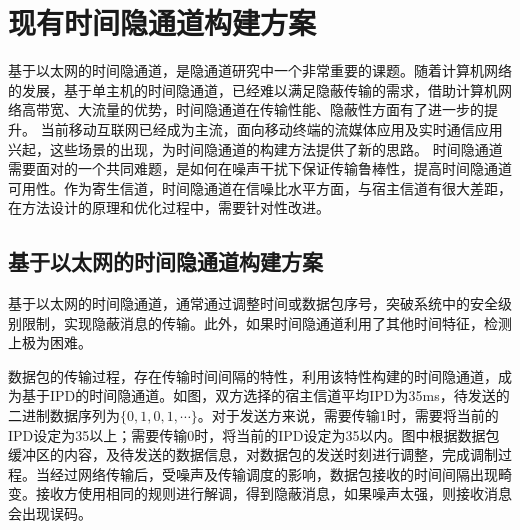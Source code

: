 \section{现有时间隐通道构建方案}
\label{chap:backinfo:ctc}

基于以太网的时间隐通道，是隐通道研究中一个非常重要的课题。随着计算机网络的发展，基于单主机的时间隐通道，已经难以满足隐蔽传输的需求，借助计算机网络高带宽、大流量的优势，时间隐通道在传输性能、隐蔽性方面有了进一步的提升。
当前移动互联网已经成为主流，面向移动终端的流媒体应用及实时通信应用兴起，这些场景的出现，为时间隐通道的构建方法提供了新的思路。
时间隐通道需要面对的一个共同难题，是如何在噪声干扰下保证传输鲁棒性，提高时间隐通道可用性。作为寄生信道，时间隐通道在信噪比水平方面，与宿主信道有很大差距，在方法设计的原理和优化过程中，需要针对性改进。

\subsection{基于以太网的时间隐通道构建方案}
\label{chap:backinfo:ctc:ethernet}
基于以太网的时间隐通道，通常通过调整时间或数据包序号，突破系统中的安全级别限制，实现隐蔽消息的传输。此外，如果时间隐通道利用了其他时间特征，检测上极为困难。


数据包的传输过程，存在传输时间间隔的特性，利用该特性构建的时间隐通道，成为基于IPD的时间隐通道。如图，双方选择的宿主信道平均IPD为35ms，待发送的二进制数据序列为$\{0, 1, 0, 1, \cdots\}$。对于发送方来说，需要传输1时，需要将当前的IPD设定为35以上；需要传输0时，将当前的IPD设定为35以内。图中根据数据包缓冲区的内容，及待发送的数据信息，对数据包的发送时刻进行调整，完成调制过程。当经过网络传输后，受噪声及传输调度的影响，数据包接收的时间间隔出现畸变。接收方使用相同的规则进行解调，得到隐蔽消息，如果噪声太强，则接收消息会出现误码。

